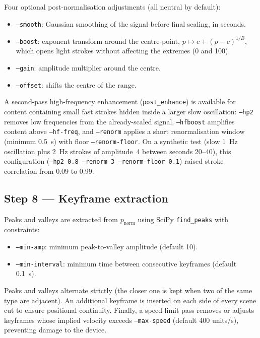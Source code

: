 \documentclass[12pt,a4paper]{article}
\begin{document}
Four optional post-normalisation adjustments (all neutral by default):

\begin{itemize}[nosep]
  \item \texttt{--smooth}: Gaussian smoothing of the signal before final
    scaling, in seconds.
  \item \texttt{--boost}: exponent transform around the centre-point,
    $p \mapsto c + (p-c)^{1/B}$, which opens light strokes without affecting
    the extremes (0 and 100).
  \item \texttt{--gain}: amplitude multiplier around the centre.
  \item \texttt{--offset}: shifts the centre of the range.
\end{itemize}

A second-pass high-frequency enhancement (\texttt{post\_enhance}) is available
for content containing small fast strokes hidden inside a larger slow
oscillation: \texttt{--hp2} removes low frequencies from the already-scaled
signal, \texttt{--hfboost} amplifies content above \texttt{--hf-freq}, and
\texttt{--renorm} applies a short renormalisation window (minimum 0.5~s) with
floor \texttt{--renorm-floor}. On a synthetic test (slow 1~Hz oscillation plus
2~Hz strokes of amplitude~4 between seconds 20--40), this configuration
(\texttt{--hp2~0.8 --renorm~3 --renorm-floor~0.1}) raised stroke correlation
from 0.09 to 0.99.

\subsection{Step 8 --- Keyframe extraction}
\label{sec:keyframes}

Peaks and valleys are extracted from $p_\mathrm{norm}$ using SciPy
\texttt{find\_peaks} with constraints:
\begin{itemize}[nosep]
  \item \texttt{--min-amp}: minimum peak-to-valley amplitude (default 10).
  \item \texttt{--min-interval}: minimum time between consecutive keyframes
    (default 0.1~s).
\end{itemize}
Peaks and valleys alternate strictly (the closer one is kept when two of the
same type are adjacent). An additional keyframe is inserted on each side of
every scene cut to ensure positional continuity. Finally, a speed-limit pass
removes or adjusts keyframes whose implied velocity exceeds
\texttt{--max-speed} (default 400 units/s), preventing damage to the device.
\end{document}
